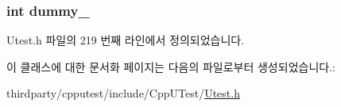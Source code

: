 \subsubsection[{\texorpdfstring{dummy\+\_\+}{dummy_}}]{\setlength{\rightskip}{0pt plus 5cm}int dummy\+\_\+}\hypertarget{class_cpp_u_test_failed_exception_a124381edd0726eaabbad6607eb02ae3b}{}\label{class_cpp_u_test_failed_exception_a124381edd0726eaabbad6607eb02ae3b}


Utest.\+h 파일의 219 번째 라인에서 정의되었습니다.



이 클래스에 대한 문서화 페이지는 다음의 파일로부터 생성되었습니다.\+:\begin{DoxyCompactItemize}
\item 
thirdparty/cpputest/include/\+Cpp\+U\+Test/\hyperlink{_utest_8h}{Utest.\+h}\end{DoxyCompactItemize}

